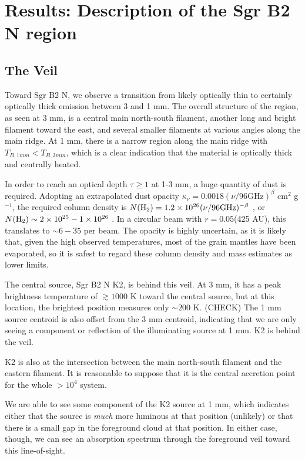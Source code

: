 \documentclass[twocolumn]{aastex61}
\begin{document}
\section{Results: Description of the Sgr B2 N region}
\subsection{The Veil}
\label{sec:theveil}
Toward Sgr B2 N, we observe a transition from likely optically thin to
certainly optically thick emission between 3 and 1 mm.  The overall structure
of the region, as seen at 3 mm, is a central main north-south filament, another
long and bright filament toward the east, and several smaller filaments at
various angles along the main ridge.  At 1 mm, there is a narrow region along
the main ridge with $T_{B,1 mm} < T_{B,3 mm}$, which is a clear indication
that the material is optically thick and centrally heated.

In order to reach an optical depth $\tau\geq1$ at 1-3 mm, a huge quantity of
dust is required.  Adopting an extrapolated dust opacity $\kappa_\nu = 0.0018
(\nu/96 \mathrm{GHz})^{\beta}$ cm$^2$ g$^{-1}$, the required column density is
$N(\textrm{H}_{2}) = 1.2\times10^{26} (\nu/96 \mathrm{GHz})^{-\beta}$ \persc, or $N(\textrm{H}_{2}) \sim
2\times10^{25} - 1\times10^{26}$ \persc.  In a circular beam with $r=0.05$\arcsec (425 AU),
this translates to $\sim6-35$ \msun per beam.  The opacity is highly uncertain,
as it is likely that, given the high observed temperatures, most of the grain
mantles have been evaporated, so it is safest to regard these column density
and mass estimates as lower limits.

The central source, Sgr B2 N K2, is behind this veil.  At 3 mm, it has a peak
brightness temperature of $\gtrsim1000$ K toward the central source, but at this
location, the brightest position measures only $\sim200$ K.  (CHECK) The 1 mm 
source centroid is also offset from the 3 mm centroid, indicating that we are
only seeing a component or reflection of the illuminating source at 1 mm.
K2 is behind the veil.

K2 is also at the intersection between the main north-south filament and the
eastern filament.  It is reasonable to suppose that it is the central
accretion point for the whole $>10^4$ \msun system.

We are able to see some component of the K2 source at 1 mm, which indicates
either that the source is \emph{much} more luminous at that position (unlikely)
or that there is a small gap in the foreground cloud at that position.
In either case, though, we can see an absorption spectrum through the foreground
veil toward this line-of-sight.
\end{document}
